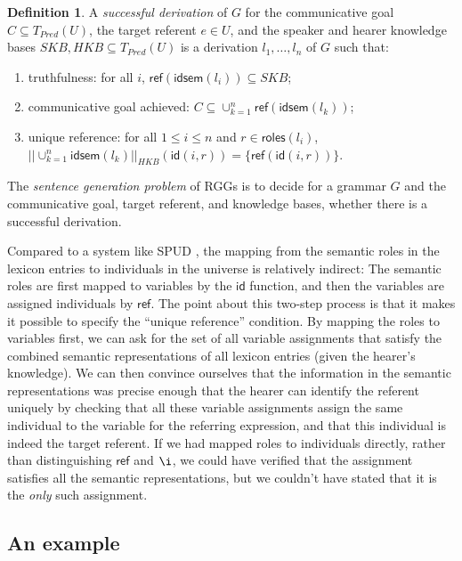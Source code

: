 \documentclass[11pt,a4]{article}
\newcommand{\roles}{\mathsf{roles}}
\newcommand{\refr}{\mathsf{ref}}
\newcommand{\id}{\mathsf{id}}
\newcommand{\idsem}{\mathsf{idsem}}
\theoremstyle{plain}
\theoremstyle{definition}
\newtheorem{definition}[theorem]{Definition}
\begin{document}
\begin{definition} \label{def:rgg-succ-deriv} A \emph{successful
    derivation} of $G$ for the communicative goal $C \subseteq
  T_{Pred}(U)$, the target referent $e \in U$, and the speaker and
  hearer knowledge bases $SKB, HKB \subseteq T_{Pred}(U)$ is a
  derivation $l_1,\ldots,l_n$ of $G$ such that:

  \begin{enumerate}
  \item truthfulness: for all $i$, $\refr(\idsem(l_i)) \subseteq SKB$;
  \item communicative goal achieved: $C \subseteq \cup_{k=1}^n \refr(\idsem(l_k))$;
  \item unique reference: for all $1 \leq i \leq n$ and $r \in
    \roles(l_i)$, $|| \cup_{k=1}^n \idsem(l_k) ||_{HKB}(\id(i,r)) =
    \{\refr(\id(i,r))\}$.
  \end{enumerate}

  The \emph{sentence generation problem} of RGGs is to decide for a
  grammar $G$ and the communicative goal, target referent, and
  knowledge bases, whether there is a successful derivation.
\end{definition}

Compared to a system like SPUD \citep{Stone2003a}, the mapping from
the semantic roles in the lexicon entries to individuals in the
universe is relatively indirect: The semantic roles are first mapped
to variables by the $\id$ function, and then the variables are
assigned individuals by $\refr$. The point about this two-step process
is that it makes it possible to specify the ``unique reference''
condition. By mapping the roles to variables first, we can ask for the
set of all variable assignments that satisfy the combined semantic
representations of all lexicon entries (given the hearer's
knowledge). We can then convince ourselves that the information in the
semantic representations was precise enough that the hearer can
identify the referent uniquely by checking that all these variable
assignments assign the same individual to the variable for the
referring expression, and that this individual is indeed the target
referent. If we had mapped roles to individuals directly, rather than
distinguishing $\refr$ and $\i$, we could have verified that the
assignment satisfies all the semantic representations, but we couldn't
have stated that it is the \emph{only} such assignment.


\subsection{An example} \label{sec:rgg-example}
\end{document}
